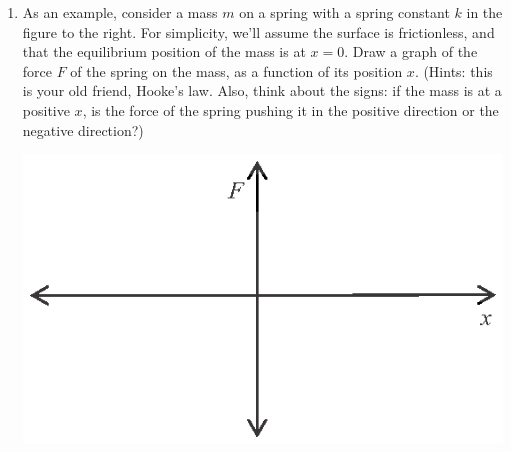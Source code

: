 \begin{enumerate}[wide, label=(\emph{\alph*})]
\item As an example, consider a mass $m$ on a spring with a spring constant $k$ in the figure to the right.  For simplicity, we'll assume the surface is frictionless, and that the equilibrium position of the mass is at $x=0$.  
Draw a graph of the force $F$ of the spring on the mass, as a function of its position $x$.  
(Hints: this is your old friend, Hooke's law.  Also, think about the signs: if the mass is at a positive $x$, is the force of the spring pushing it in the positive direction or the negative direction?)
\begin{center}
\vspace{-0.1in}
\includegraphics{potential_intro/activity_1_figs/F_axes.eps}
\hspace{0.5in}
\end{center}


\end{enumerate}
